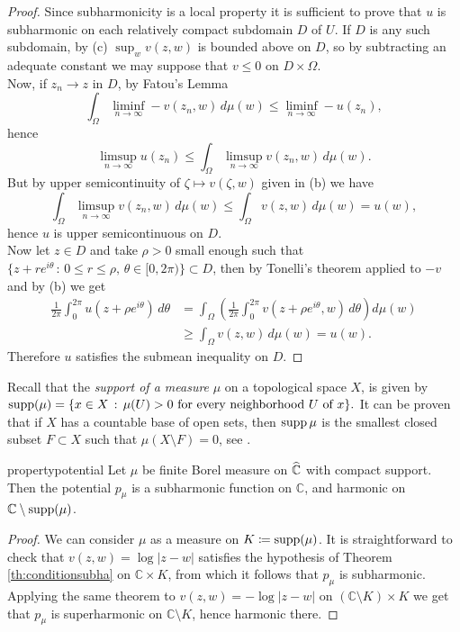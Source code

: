 \begin{proof}
Since subharmonicity is a local property it is sufficient to prove that $u$ is subharmonic on each relatively compact subdomain $D$ of $U$. If $D$ is any such subdomain, by (c) $\sup_w v(z,w)$ is bounded above on $D$, so by subtracting an adequate constant we may suppose that $v\leq 0$ on $D\times \Omega$.\\

Now, if $z_n\rightarrow z$ in $D$, by Fatou's Lemma
$$\int_\Omega \liminf_{n\rightarrow \infty} -v(z_n,w)\,d\mu(w) \leq \liminf_{n\rightarrow \infty} -u(z_n),$$
hence
$$\limsup_{n\rightarrow \infty} u(z_n) \leq \int_\Omega \limsup_{n\rightarrow \infty} v(z_n,w)\,d\mu(w).$$
But by upper semicontinuity of $\zeta \mapsto v(\zeta,w)$ given in (b) we have
$$ \int_\Omega \limsup_{n\rightarrow \infty} v(z_n,w)\,d\mu(w) \leq \int_\Omega v(z,w) \,d\mu(w)=u(w),$$
hence $u$ is upper semicontinuous on $D$.\\

Now let $z\in D$ and take $\rho>0$ small enough such that $\{z+r e^{i\theta}\,:\, 0\leq r\leq \rho,\, \theta\in[0,2\pi)\} \subset D$, then by Tonelli's theorem \cite[Theorem 10.9]{bartle} applied to $-v$ and by (b) we get
\begin{align*}
\frac{1}{2\pi} \int_0^{2\pi} u(z+\rho e^{i\theta})\,d\theta &= \int_\Omega \left( \frac{1}{2\pi} \int_0^{2\pi} v(z+\rho e^{i\theta},w)\,d\theta \right) d\mu(w)\\
&\geq \int_\Omega v(z,w)\,d\mu(w) = u(w).
\end{align*}
Therefore $u$ satisfies the submean inequality on $D$.
\end{proof}

Recall that the {\it support of a measure} $\mu$ on a topological space $X$, is given by $\text{supp}(\mu)=\{x\in X\,:\, \mu(U)>0 \text{ for every neighborhood } U \text{ of } x\}.$ It can be proven that if $X$ has a countable base of open sets, then $\text{supp}\,\mu$ is the smallest closed subset $F\subset X$ such that $\mu(X\setminus F)=0$, see \cite[Theorem A.1.2]{ransford}.\\

\begin{mytheo}{}{propertypotential}
Let $\mu$ be finite Borel measure on $\widehat{\mathbb{C}}$ with compact support. Then the potential $p_\mu$ is a subharmonic function on $\mathbb{C}$, and harmonic on $\mathbb{C}\setminus \text{supp}(\mu)$.
\end{mytheo}

\begin{proof}
We can consider $\mu$ as a measure on $K\coloneqq \text{supp}(\mu)$. It is straightforward to check that $v(z,w) = \log|z-w|$ satisfies the hypothesis of Theorem \ref{th:conditionsubha} on $\mathbb{C}\times K$, from which it follows that $p_\mu$ is subharmonic. Applying the same theorem to $v(z,w)=-\log|z-w|$ on $(\mathbb{C}\setminus K)\times K$ we get that $p_\mu$ is superharmonic on $\mathbb{C}\setminus K$, hence harmonic there.
\end{proof}

